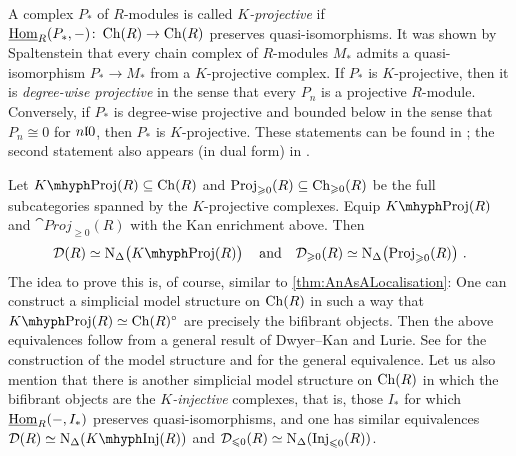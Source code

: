 \begin{numpar}
	A complex $P_*$ of $R$-modules is called \emph{$K$-projective} if $\operatorname{\underline{Hom}}_R(P_*,-)\colon \operatorname{Ch}(R)\rightarrow \operatorname{Ch}(R)$ preserves quasi-isomorphisms. It was shown by Spaltenstein \cite{KProjective} that every chain complex of $R$-modules $M_*$ admits a quasi-isomorphism $P_*\rightarrow M_*$ from a $K$-projective complex. If $P_*$ is $K$-projective, then it is \emph{degree-wise projective} in the sense that every $P_n$ is a projective $R$-module. Conversely, if $P_*$ is degree-wise projective and bounded below in the sense that $P_n\cong0$ for $n\lle 0$, then $P_*$ is $K$-projective. These statements can be found in \cite[Lemma~\href{https://people.math.rochester.edu/faculty/doug/otherpapers/hovey-model-cats.pdf\#page=52}{2.3.6}]{HoveyModelCategories}; the second statement also appears (in dual form) in \cite[]{Stacks}.
	
	Let $K\mhyph\cat{Proj}(R)\subseteq\Ch(R)$ and $\mathrm{Proj}_{\geqslant 0}(R)\subseteq \operatorname{Ch}_{\geqslant 0}(R)$ be the full subcategories spanned by the $K$-projective complexes. Equip $K\mhyph\cat{Proj}(R)$ and $\cat{Proj}_{\geqslant 0}(R)$ with the Kan enrichment above. Then
	\begin{equation*}
		\Dd(R)\simeq \N_\Delta\lef(K\mhyph\cat{Proj}(R)\righ)\quad\text{and}\quad \Dd_{\geqslant 0}(R)\simeq \N_\Delta\lef(\cat{Proj}_{\geqslant 0}(R)\righ)\,.
	\end{equation*}
	The idea to prove this is, of course, similar to \cref{thm:AnAsALocalisation}: One can construct a simplicial model structure on $\operatorname{Ch}(R)$ in such a way that $K\mhyph\cat{Proj}(R)\simeq \Ch(R)^\circ$ are precisely the bifibrant objects. Then the above equivalences follow from a general result of Dwyer--Kan and Lurie. See \cite[\S\href{https://people.math.rochester.edu/faculty/doug/otherpapers/hovey-model-cats.pdf\#page=50}{2.3}]{HoveyModelCategories} for the construction of the model structure and \cite[Theorem~]{HA} for the general equivalence. Let us also mention that there is another simplicial model structure on $\operatorname{Ch}(R)$ in which the bifibrant objects are the \emph{$K$-injective} complexes, that is, those $I_*$ for which $\operatorname{\underline{Hom}}_R(-,I_*)$ preserves quasi-isomorphisms, and one has similar equivalences $\Dd(R)\simeq \N_\Delta(K\mhyph\cat{Inj}(R))$ and $\mathcal{D}_{\leqslant 0}(R)\simeq \operatorname{N}_\Delta(\mathrm{Inj}_{\leqslant 0}(R))$.
	

\end{numpar}
